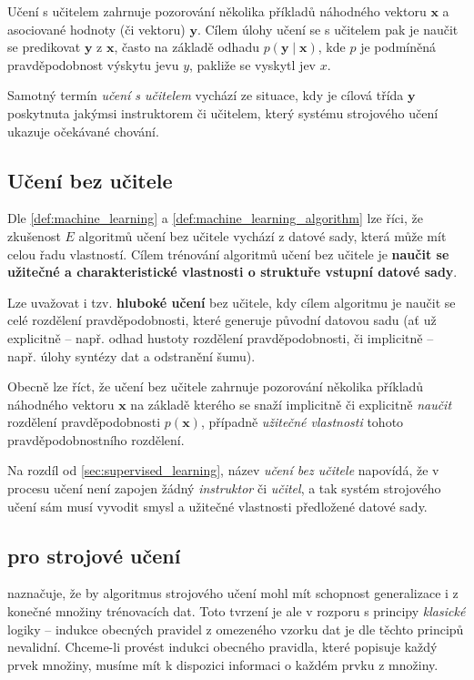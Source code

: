 Učení s učitelem zahrnuje pozorování několika příkladů náhodného vektoru $\mathbf{x}$ a asociované hodnoty (či vektoru) $\mathbf{y}$.
Cílem úlohy učení se s učitelem pak je naučit se predikovat $\mathbf{y}$ z $\mathbf{x}$, často na základě odhadu $p(\mathbf{y}\mid\mathbf{x})$, kde $p$ je podmíněná pravděpodobnost výskytu jevu $y$, pakliže se vyskytl jev $x$. \cite{Goodfellow2016}

Samotný termín \emph{učení s učitelem} vychází ze situace, kdy je cílová třída $\mathbf{y}$ poskytnuta jakýmsi instruktorem či učitelem, který systému strojového učení ukazuje očekávané chování. \cite{Goodfellow2016}
\subsection{Učení bez učitele}
\label{sec:unsupervised_learning}
Dle \autoref{def:machine_learning} a \autoref{def:machine_learning_algorithm} lze říci, že zkušenost $E$ algoritmů učení bez učitele vychází z datové sady, která může mít celou řadu vlastností.
Cílem trénování algoritmů učení bez učitele je \textbf{naučit se užitečné a charakteristické vlastnosti o struktuře vstupní datové sady}.

Lze uvažovat i tzv. \textbf{hluboké učení} bez učitele, kdy cílem algoritmu je naučit se celé rozdělení pravděpodobnosti, které generuje původní datovou sadu (ať už explicitně – např. odhad hustoty rozdělení pravděpodobnosti, či implicitně – např. úlohy syntézy dat a odstranění šumu). \cite{Chollet2017}

Obecně lze říct, že učení bez učitele zahrnuje pozorování několika příkladů náhodného vektoru $\mathbf{x}$ na základě kterého se snaží implicitně či explicitně \emph{naučit} rozdělení pravděpodobnosti $p(\mathbf{x})$, případně \emph{užitečné vlastnosti} tohoto pravděpodobnostního rozdělení.

Na rozdíl od \autoref{sec:supervised_learning}, název \emph{učení bez učitele} napovídá, že v procesu učení není zapojen žádný \emph{instruktor} či \emph{učitel}, a tak systém strojového učení sám musí vyvodit smysl a užitečné vlastnosti předložené datové sady. \cite{Goodfellow2016}
\subsection{ pro strojové učení}
\label{sec:no_free_lunch}
\textcite{Vapnik2000} naznačuje, že by algoritmus strojového učení mohl mít schopnost generalizace i z konečné množiny trénovacích dat. 
Toto tvrzení je ale v rozporu s principy \emph{klasické} logiky – indukce obecných pravidel \cite{Hume1978} z omezeného vzorku dat je dle těchto principů nevalidní.
Chceme-li provést indukci obecného pravidla, které popisuje každý prvek množiny, musíme mít k dispozici informaci o každém prvku z množiny.  \cite{Goodfellow2016}

